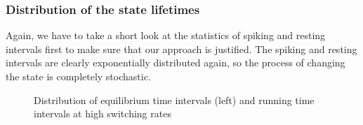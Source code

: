 \documentclass[12pt,a4paper]{article}
\begin{document}
\subsubsection{Distribution of the state lifetimes}
Again, we have to take a short look at the statistics of spiking and resting intervals first to make sure that our approach is justified. The spiking and resting intervals are clearly exponentially distributed again, so the process of changing the state is completely stochastic.
\begin{figure}[H]
	\hspace*{-0.5cm}
	\caption{Distribution of equilibrium time intervals (left) and running time intervals at high switching rates}
	\label{intdistanhopf}
\end{figure}
\end{document}
